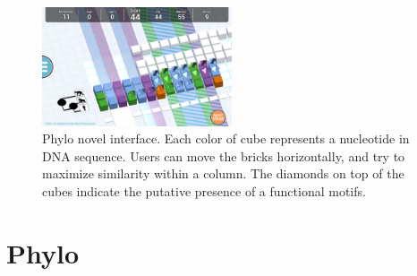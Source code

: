 \documentclass{article}
\begin{document}

\begin{figure}
 \centering
  \includegraphics[width=0.5\textwidth]{Phylo3_3.png}
 \caption{Phylo novel interface. Each color of cube represents a nucleotide in DNA sequence. Users can move the bricks horizontally, and try to maximize similarity within a column. The diamonds on top of the cubes indicate the putative presence of a functional motifs.}
 \label{fig:1}
\end{figure}
\section{Phylo}
\end{document}
